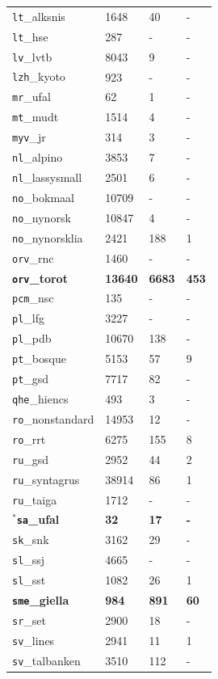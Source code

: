 \begin{table}[H]
{\begin{tabular}{|l|l|l|l|}
\texttt{lt}\_alksnis & 1648 & 40 & -\\
\texttt{lt}\_hse & 287 & - & -\\
\texttt{lv}\_lvtb & 8043 & 9 & -\\
\texttt{lzh}\_kyoto & 923 & - & -\\
\texttt{mr}\_ufal & 62 & 1 & -\\
\texttt{mt}\_mudt & 1514 & 4 & -\\
\texttt{myv}\_jr & 314 & 3 & -\\
\texttt{nl}\_alpino & 3853 & 7 & -\\
\texttt{nl}\_lassysmall & 2501 & 6 & -\\
\texttt{no}\_bokmaal & 10709 & - & -\\
\texttt{no}\_nynorsk & 10847 & 4 & -\\
\texttt{no}\_nynorsklia & 2421 & 188 & 1\\
\texttt{orv}\_rnc & 1460 & - & -\\
\textbf{\texttt{orv}\_torot} & \textbf{13640} & \textbf{6683} & \textbf{453}\\
\texttt{pcm}\_nsc & 135 & - & -\\
\texttt{pl}\_lfg & 3227 & - & -\\
\texttt{pl}\_pdb & 10670 & 138 & -\\
\texttt{pt}\_bosque & 5153 & 57 & 9\\
\texttt{pt}\_gsd & 7717 & 82 & -\\
\texttt{qhe}\_hiencs & 493 & 3 & -\\
\texttt{ro}\_nonstandard & 14953 & 12 & -\\
\texttt{ro}\_rrt & 6275 & 155 & 8\\
\texttt{ru}\_gsd & 2952 & 44 & 2\\
\texttt{ru}\_syntagrus & 38914 & 86 & 1\\
\texttt{ru}\_taiga & 1712 & - & -\\
\textbf{\(^{*}\)\texttt{sa}\_ufal} & \textbf{32} & \textbf{17} & \textbf{-}\\
\texttt{sk}\_snk & 3162 & 29 & -\\
\texttt{sl}\_ssj & 4665 & - & -\\
\texttt{sl}\_sst & 1082 & 26 & 1\\
\textbf{\texttt{sme}\_giella} & \textbf{984} & \textbf{891} & \textbf{60}\\
\texttt{sr}\_set & 2900 & 18 & -\\
\texttt{sv}\_lines & 2941 & 11 & 1\\
\texttt{sv}\_talbanken & 3510 & 112 & -\\

\end{tabular}}
\end{table}
